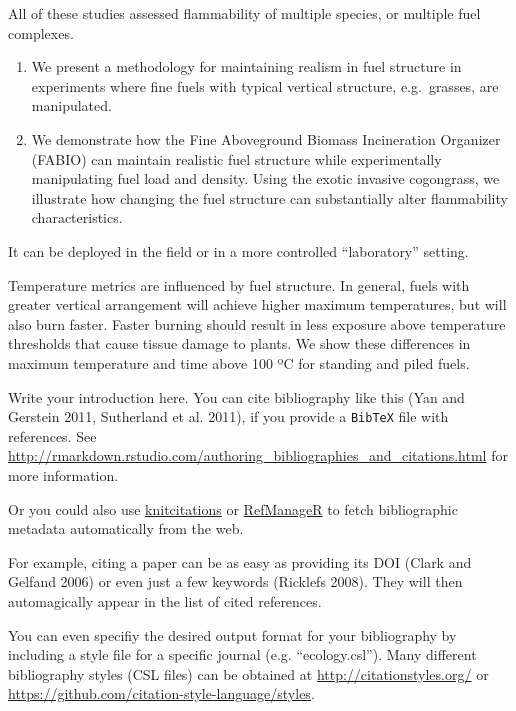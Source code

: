 \documentclass[11pt,a4paper]{article}
\begin{document}
All of these studies assessed flammability of multiple species, or
multiple fuel complexes.

\begin{enumerate}
\def\labelenumi{\arabic{enumi}.}
\setcounter{enumi}{2}
\item
  We present a methodology for maintaining realism in fuel structure in
  experiments where fine fuels with typical vertical structure,
  e.g.~grasses, are manipulated.
\item
  We demonstrate how the Fine Aboveground Biomass Incineration Organizer
  (FABIO) can maintain realistic fuel structure while experimentally
  manipulating fuel load and density. Using the exotic invasive
  cogongrass, we illustrate how changing the fuel structure can
  substantially alter flammability characteristics.
\end{enumerate}

It can be deployed in the field or in a more controlled ``laboratory''
setting.

Temperature metrics are influenced by fuel structure. In general, fuels
with greater vertical arrangement will achieve higher maximum
temperatures, but will also burn faster. Faster burning should result in
less exposure above temperature thresholds that cause tissue damage to
plants. We show these differences in maximum temperature and time above
100 ºC for standing and piled fuels.

Write your introduction here. You can cite bibliography like this (Yan
and Gerstein 2011, Sutherland et al. 2011), if you provide a
\texttt{BibTeX} file with references. See
\url{http://rmarkdown.rstudio.com/authoring_bibliographies_and_citations.html}
for more information.

Or you could also use
\href{https://cran.r-project.org/web/packages/knitcitations/index.html}{knitcitations}
or
\href{https://cran.r-project.org/web/packages/RefManageR/index.html}{RefManageR}
to fetch bibliographic metadata automatically from the web.

For example, citing a paper can be as easy as providing its DOI (Clark
and Gelfand 2006) or even just a few keywords (Ricklefs 2008). They will
then automagically appear in the list of cited references.

You can even specifiy the desired output format for your bibliography by
including a style file for a specific journal (e.g. ``ecology.csl'').
Many different bibliography styles (CSL files) can be obtained at
\url{http://citationstyles.org/} or
\url{https://github.com/citation-style-language/styles}.
\end{document}
